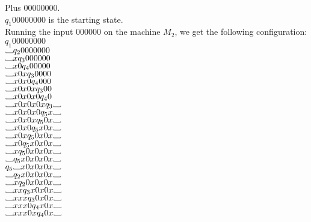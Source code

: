 \documentclass[12pt]{article}
\newcommand\Vtextvisiblespace[1][.8em]{%
	\mbox{\kern.07em\vrule height.3ex}%
	\vbox{\hrule width#1}%
	\hbox{\vrule height.3ex}}
\begin{document}
\pagebreak
Plus 00000000. \\

$q_1 00000000$ is the starting state. \\
Running the input 000000 on the machine $M_2$, we get the following configuration: \\

$q_1 00000000$ \\
$\Vtextvisiblespace           q_2 0000000 $  \\ 
$\Vtextvisiblespace x         q_3 000000  $  \\ 
$\Vtextvisiblespace x0        q_4 00000   $  \\ 
$\Vtextvisiblespace x0x       q_3 0000    $  \\ 
$\Vtextvisiblespace x0x0      q_4 000     $  \\ 
$\Vtextvisiblespace x0x0x     q_3 00      $  \\ 
$\Vtextvisiblespace x0x0x0    q_4 0       $  \\ 
$\Vtextvisiblespace x0x0x0x   q_3         \Vtextvisiblespace  $  \\ 
$\Vtextvisiblespace x0x0x0    q_5 x       \Vtextvisiblespace  $  \\ 
$\Vtextvisiblespace x0x0x     q_5 0x      \Vtextvisiblespace  $  \\ 
$\Vtextvisiblespace x0x0      q_5 x0x     \Vtextvisiblespace  $  \\ 
$\Vtextvisiblespace x0x       q_5 0x0x    \Vtextvisiblespace  $  \\ 
$\Vtextvisiblespace x0        q_5 x0x0x   \Vtextvisiblespace  $  \\ 
$\Vtextvisiblespace x         q_5 0x0x0x  \Vtextvisiblespace  $  \\ 
$\Vtextvisiblespace           q_5 x0x0x0x \Vtextvisiblespace  $  \\ 
$q_5 \Vtextvisiblespace           x0x0x0x \Vtextvisiblespace  $  \\ 
$\Vtextvisiblespace           q_2 x0x0x0x \Vtextvisiblespace  $  \\
$\Vtextvisiblespace x         q_2 0x0x0x  \Vtextvisiblespace  $  \\
$\Vtextvisiblespace xx        q_3 x0x0x   \Vtextvisiblespace  $  \\
$\Vtextvisiblespace xxx       q_3 0x0x    \Vtextvisiblespace  $  \\
$\Vtextvisiblespace xxx0      q_4 x0x     \Vtextvisiblespace  $  \\
$\Vtextvisiblespace xxx0x     q_4 0x      \Vtextvisiblespace  $  \\
\end{document}
